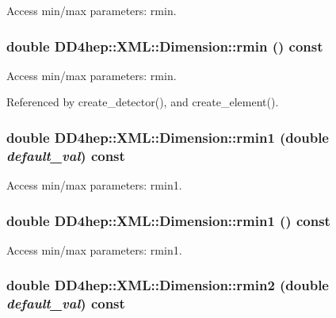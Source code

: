Access min/max parameters: rmin. \hypertarget{struct_d_d4hep_1_1_x_m_l_1_1_dimension_a8caa588fa3e1be7e5eed684cc962abc4}{
\subsubsection[{rmin}]{\setlength{\rightskip}{0pt plus 5cm}double DD4hep::XML::Dimension::rmin () const}}
\label{struct_d_d4hep_1_1_x_m_l_1_1_dimension_a8caa588fa3e1be7e5eed684cc962abc4}


Access min/max parameters: rmin. 

Referenced by create\_\-detector(), and create\_\-element().\hypertarget{struct_d_d4hep_1_1_x_m_l_1_1_dimension_abe93027899e16e048cc8dc5a6358e039}{
\subsubsection[{rmin1}]{\setlength{\rightskip}{0pt plus 5cm}double DD4hep::XML::Dimension::rmin1 (double {\em default\_\-val}) const}}
\label{struct_d_d4hep_1_1_x_m_l_1_1_dimension_abe93027899e16e048cc8dc5a6358e039}


Access min/max parameters: rmin1. \hypertarget{struct_d_d4hep_1_1_x_m_l_1_1_dimension_a0d8fdeaa3fbd61665dccff7a36f35456}{
\subsubsection[{rmin1}]{\setlength{\rightskip}{0pt plus 5cm}double DD4hep::XML::Dimension::rmin1 () const}}
\label{struct_d_d4hep_1_1_x_m_l_1_1_dimension_a0d8fdeaa3fbd61665dccff7a36f35456}


Access min/max parameters: rmin1. \hypertarget{struct_d_d4hep_1_1_x_m_l_1_1_dimension_aed3c20406e5bd0bee9b4043475c10e3e}{
\subsubsection[{rmin2}]{\setlength{\rightskip}{0pt plus 5cm}double DD4hep::XML::Dimension::rmin2 (double {\em default\_\-val}) const}}
\label{struct_d_d4hep_1_1_x_m_l_1_1_dimension_aed3c20406e5bd0bee9b4043475c10e3e}


